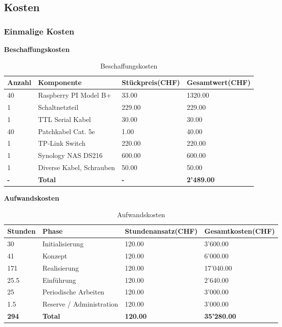 
\subsection{Kosten}

\subsubsection{Einmalige Kosten}
\textbf{Beschaffungskosten}
\begin{table}[H]
\centering
\begin{tabular}{p{2cm}p{5cm}p{4cm}p{4cm}}
\hline
\rowcolor{heading} \textbf{Anzahl} & \textbf{Komponente} & \hfill \textbf{Stückpreis(CHF)} & \hfill \textbf{Gesamtwert(CHF)} \\\hline
40 & Raspberry PI Model B+ & \hfill 33.00 & \hfill 1320.00 \\\hline
1 & Schaltnetzteil & \hfill  229.00 & \hfill 229.00 \\\hline
1 & TTL Serial Kabel & \hfill 30.00 & \hfill 30.00 \\\hline
40 & Patchkabel Cat. 5e & \hfill 1.00 & \hfill 40.00 \\\hline
1 & TP-Link Switch & \hfill 220.00 & \hfill 220.00 \\\hline
1 & Synology NAS DS216 & \hfill 600.00 & \hfill 600.00 \\\hline
1 & Diverse Kabel, Schrauben & \hfill 50.00 & \hfill 50.00 \\\hline
\rowcolor{subheading}\textbf{-} & \textbf{Total} & \hfill \textbf{-} & \hfill \textbf{2'489.00} \\\hline
\end{tabular}
\caption{Beschaffungskosten}
\end{table}

\textbf{Aufwandskosten}
\begin{table}[H]
\centering
\begin{tabular}{p{2cm}p{5cm}p{4cm}p{4cm}}
\hline
\rowcolor{heading} \textbf{Stunden} & \textbf{Phase} & \textbf{Stundenansatz(CHF)} &\hfill \textbf{Gesamtkosten(CHF)} \\\hline
30 & Initialisierung & \hfill 120.00 & \hfill 3'600.00 \\\hline
41 & Konzept & \hfill 120.00 & \hfill  6'000.00 \\\hline
171 & Realisierung & \hfill 120.00 & \hfill  17'040.00 \\\hline
25.5 & Einführung & \hfill 120.00 & \hfill 2'640.00 \\\hline
25 & Periodische Arbeiten & \hfill 120.00 & \hfill  3'000.00 \\\hline
1.5 & Reserve / Administration & \hfill 120.00 & \hfill 3'000.00 \\\hline
\rowcolor{subheading}\textbf{294} & \textbf{Total} &\hfill  \textbf{120.00} & \hfill \textbf{35'280.00} \\\hline
\end{tabular}
\caption{Aufwandskosten}
\end{table}

